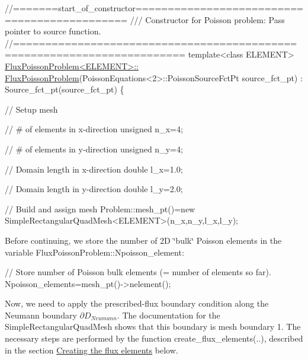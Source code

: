 \begin{DoxyCodeInclude}
\textcolor{comment}{//=======start\_of\_constructor=============================================}
\textcolor{comment}{/// Constructor for Poisson problem: Pass pointer to source function.}
\textcolor{comment}{}\textcolor{comment}{//========================================================================}
\textcolor{keyword}{template}<\textcolor{keyword}{class} ELEMENT>
\hyperlink{classFluxPoissonProblem_a1b57e0c67634586cb69fbeeec7874e36}{FluxPoissonProblem<ELEMENT>::}
\hyperlink{classFluxPoissonProblem_a1b57e0c67634586cb69fbeeec7874e36}{      FluxPoissonProblem}(PoissonEquations<2>::PoissonSourceFctPt source\_fct\_pt)
       :  Source\_fct\_pt(source\_fct\_pt)
\{ 

 \textcolor{comment}{// Setup mesh}

 \textcolor{comment}{// # of elements in x-direction}
 \textcolor{keywordtype}{unsigned} n\_x=4;

 \textcolor{comment}{// # of elements in y-direction}
 \textcolor{keywordtype}{unsigned} n\_y=4;

 \textcolor{comment}{// Domain length in x-direction}
 \textcolor{keywordtype}{double} l\_x=1.0;

 \textcolor{comment}{// Domain length in y-direction}
 \textcolor{keywordtype}{double} l\_y=2.0;

 \textcolor{comment}{// Build and assign mesh}
 Problem::mesh\_pt()=\textcolor{keyword}{new} SimpleRectangularQuadMesh<ELEMENT>(n\_x,n\_y,l\_x,l\_y);

\end{DoxyCodeInclude}


Before continuing, we store the number of 2D \char`\"{}bulk\char`\"{} Poisson elements in the variable {\ttfamily Flux\+Poisson\+Problem\+::\+Npoisson\+\_\+element\+:} 


\begin{DoxyCodeInclude}
 \textcolor{comment}{// Store number of Poisson bulk elements (= number of elements so far).}
 Npoisson\_elements=mesh\_pt()->nelement();

\end{DoxyCodeInclude}


Now, we need to apply the prescribed-\/flux boundary condition along the Neumann boundary $ \partial D_{Neumann} $. The documentation for the {\ttfamily Simple\+Rectangular\+Quad\+Mesh} shows that this boundary is mesh boundary 1. The necessary steps are performed by the function {\ttfamily create\+\_\+flux\+\_\+elements}(..), described in the section \hyperlink{index_create_flux}{Creating the flux elements} below.



